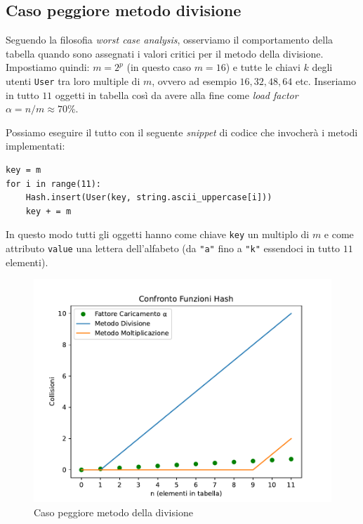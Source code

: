 \subsection{Caso peggiore metodo divisione} \label{caso_peggiore_div}
Seguendo la filosofia \textit{worst case analysis}, osserviamo il comportamento della tabella quando sono assegnati i valori critici per il metodo della divisione. \\
Impostiamo quindi: $m = 2^{p}$ (in questo caso $m = 16$) e tutte le chiavi $k$ degli utenti \verb|User| tra loro multiple di $m$, ovvero ad esempio $16,32,48,64$ etc.
Inseriamo in tutto $11$ oggetti in tabella così da avere alla fine come \textit{load factor} $\alpha = n/m \approx 70\%$.

Possiamo eseguire il tutto con il seguente \textit{snippet} di codice che invocherà i metodi implementati:

\lstset{
      basicstyle=\small,
      xleftmargin=.1\textwidth,
}
\begin{lstlisting}
key = m
for i in range(11):
    Hash.insert(User(key, string.ascii_uppercase[i]))
    key + = m
\end{lstlisting}


In questo modo tutti gli oggetti hanno come chiave \verb|key| un multiplo di $m$ e come attributo \verb|value| una lettera dell'alfabeto (da \verb|"a"| fino a \verb|"k"| essendoci in tutto $11$ elementi).

\begin{figure}[htb]
    \begin{center}
    \includegraphics[scale=0.65]{src/img/worstcase.pdf}
    \caption{Caso peggiore metodo della divisione}
     \label{fig:met_div}
    \end{center}
\end{figure}

